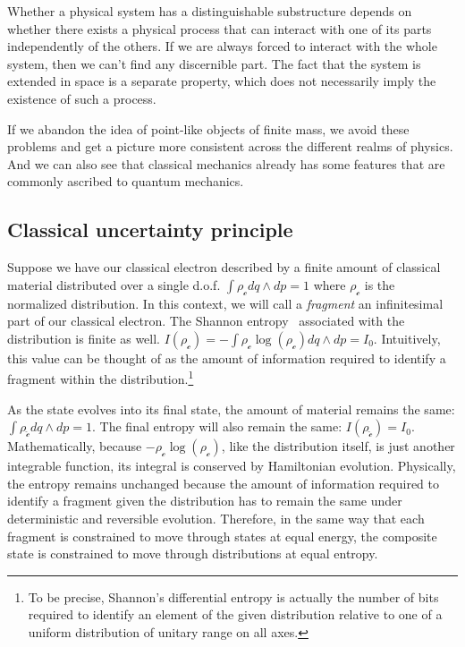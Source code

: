 \documentclass[smallextended]{svjour3}
\numberwithin{equation}{section}
\theoremstyle{definition}
\begin{document}
Whether a physical system has a distinguishable substructure depends on whether there exists a physical process that can interact with one of its parts independently of the others. If we are always forced to interact with the whole system, then we can't find any discernible part. The fact that the system is extended in space is a separate property, which does not necessarily imply the existence of such a process.

If we abandon the idea of point-like objects of finite mass, we avoid these problems and get a picture more consistent across the different realms of physics. And we can also see that classical mechanics already has some features that are commonly ascribed to quantum mechanics.

\subsection{Classical uncertainty principle}

Suppose we have our classical electron described by a finite amount of classical material distributed over a single d.o.f. $\int \rho_\mathcal{c} dq \wedge dp = 1$ where $\rho_\mathcal{c}$ is the normalized distribution. In this context, we will call a \emph{fragment} an infinitesimal part of our classical electron. The Shannon entropy~\cite{Shannon} associated with the distribution is finite as well. $I(\rho_\mathcal{c}) = - \int \rho_\mathcal{c} \log (\rho_\mathcal{c})  dq \wedge dp = I_0$. Intuitively, this value can be thought of as the amount of information required to identify a fragment within the distribution.\footnote{To be precise, Shannon's differential entropy is actually the number of bits required to identify an element of the given distribution relative to one of a uniform distribution of unitary range on all axes.}

As the state evolves into its final state, the amount of material remains the same: $\int \rho_{\hat{\mathcal{c}}} dq \wedge dp = 1$. The final entropy will also remain the same: $I(\rho_{\hat{\mathcal{c}}}) = I_0$. Mathematically, because $-\rho_\mathcal{c} \log (\rho_\mathcal{c})$, like the distribution itself, is just another integrable function, its integral is conserved by Hamiltonian evolution. Physically, the entropy remains unchanged because the amount of information required to identify a fragment given the distribution has to remain the same under deterministic and reversible evolution. Therefore, in the same way that each fragment is constrained to move through states at equal energy, the composite state is constrained to move through distributions at equal entropy.
\end{document}

